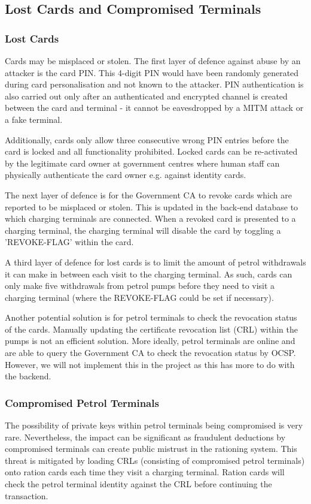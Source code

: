 \documentclass[a4paper,10pt]{llncs}
\begin{document}
\subsection{Lost Cards and Compromised Terminals}
\label{section:lost}
\subsubsection{Lost Cards}
Cards may be misplaced or stolen. The first layer of defence against abuse by an attacker is the card PIN. This 4-digit PIN would have been randomly generated during card personalisation and not known to the attacker. PIN authentication is also carried out only after an authenticated and encrypted channel is created between the card and terminal - it cannot be eavesdropped by a MITM attack or a fake terminal. 

Additionally, cards only allow three consecutive wrong PIN entries before the card is locked and all functionality prohibited. Locked cards can be re-activated by the legitimate card owner at government centres where human staff can physically authenticate the card owner e.g. against identity cards.

The next layer of defence is for the Government CA to revoke cards which are reported to be misplaced or stolen. This is updated in the back-end database to which charging terminals are connected. When a revoked card is presented to a charging terminal, the charging terminal will disable the card by toggling a 'REVOKE-FLAG' within the card.

A third layer of defence for lost cards is to limit the amount of petrol withdrawals it can make in between each visit to the charging terminal. As such, cards can only make five withdrawals from petrol pumps before they need to visit a charging terminal (where the REVOKE-FLAG could be set if necessary).

Another potential solution is for petrol terminals to check the revocation status of the cards. Manually updating the certificate revocation list (CRL) within the pumps is not an efficient solution. More ideally, petrol terminals are online and are able to query the Government CA to check the revocation status by OCSP. However, we will not implement this in the project as this has more to do with the backend.

\subsubsection{Compromised Petrol Terminals}
\label{Design:CompromisedPT}
The possibility of private keys within petrol terminals being compromised is very rare. Nevertheless, the impact can be significant as fraudulent deductions by compromised terminals can create public mistrust in the rationing system. This threat is mitigated by loading CRLs (consisting of compromised petrol terminals) onto ration cards each time they visit a charging terminal. Ration cards will check the petrol terminal identity against the CRL before continuing the transaction.
\end{document}
